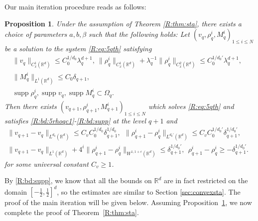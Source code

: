 \documentclass[10pt,a4paper]{amsart}
\numberwithin{equation}{section}
\newtheorem{proposition}[theorem]{Proposition}
\DeclareMathOperator{\supp}{supp}
\def\geq{\geqslant}
\def\leq{\leqslant}
\def\bp{\begin{proposition}}
\def\ep{\end{proposition}}
\def\geq{\geqslant}
\def\leq{\leqslant}
\begin{document}
      Our main iteration procedure reads as follows:
\bp\label{R:prop:sta}
Under the assumption of Theorem \ref{R:thm:sta}, there exists  a choice of parameters $a,b,\beta$  such
that the following holds: Let $(v_q,  \rho^i_q,  M^i_q)_{1\leq i \leq N}$ be a solution to the system \eqref{R:eq:5qth} satisfying \begin{align}
\|v_q\|_ {C_{x}^1(\mathbb{R}^d)}\leq C_0^{1/d_0}\lambda_q^{ d+1},\
\|  \rho^i_{q}\|_ {C_{x}^1(\mathbb{R}^d)}+\lambda_q^{-1}\|  \rho^i_{q}\|_ {C_{x}^2(\mathbb{R}^d)}\leq C_0^{1/d_0'} \lambda_q^{ d+1},
\label{R:bd:5rhoqc1}\\
 \|M^i_q\|_{L^1(\mathbb{R}^d)}\leq C_0 \delta_{q+1},&\label{R:bd:5rql1}\\
 \supp\rho_q^i,\supp v_q,\supp M_q^i\subset\Omega_q.&\label{R:bd:supp}
\end{align}
Then there exists 
$(v_{q+1},  \rho^i_{q+1},  M^i_{q+1})_{1\leq i \leq N}$ which solves \eqref{R:eq:5qth} and satisfies \eqref{R:bd:5rhoqc1}-\eqref{R:bd:supp} at the level $q+1$ and
\begin{align}
\|v_{q+1}-v_{q}\|_{L^{d_0}(\mathbb{R}^d)}\leq
C_vC_0^{1/d_0}\delta_{q+1}^{1/d_0},\label{R:bd:5vq+1-vqldd}\ \
\|  \rho^i_{q+1}-  \rho^i_{q}\|_{L^{d_0'}(\mathbb{R}^d)}\leq 
C_v C_0^{1/{d_0'}}\delta_{q+1}^{1/{d_0'}},&\\%
 \|v_{q+1}-v_{q}\|_{L^{1}(\mathbb{R}^d)}+ 4^{i}\|  \rho^i_{q+1}-  \rho^i_{q}\|_{W^{1,1+\epsilon}(\mathbb{R}^d)}\leq 
 \delta_{q+1}^{1/d_0'},\  \ \rho^i_{q+1} -   \rho^i_q\geq - \delta_{q+1}^{1/d_0'}.&\label{R:bd:5rhoq+1-rhoql1}
\end{align}for some universal constant $C_v\geq1$.  
\ep
  

By \eqref{R:bd:supp}, we know that all the bounds on $\mathbb{R}^d$ are in fact restricted on the domain $[-\frac12,\frac12]^d$, so the estimates are similar to Section \ref{sec:convexsta}. 
The proof of the main iteration  will be given below. 
Assuming Proposition~\ref{R:prop:sta}, we now complete the proof of Theorem~\ref{R:thm:sta}.
 
\end{document}
